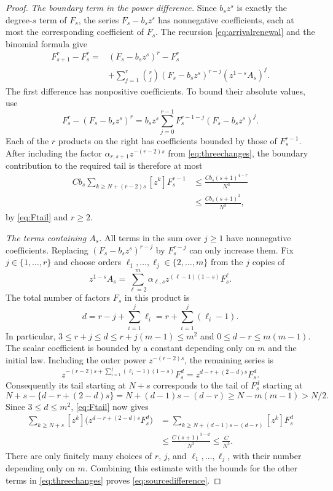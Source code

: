 \documentclass[11pt,letterpaper,reqno]{amsart}
\numberwithin{equation}{section}
\theoremstyle{plain}
\theoremstyle{remark}
\begin{document}
\begin{proof}
\emph{The boundary term in the power difference.}
Since $b_sz^s$ is exactly the degree-$s$ term of $F_s$, the series $F_s-b_sz^s$ has nonnegative coefficients, each at most the corresponding coefficient of $F_s$. The recursion \eqref{eq:arrivalrenewal} and the binomial formula give
\[
\begin{aligned}
 F_{s+1}^r-F_s^r
 ={}&(F_s-b_sz^s)^r-F_s^r\\
 &+\sum_{j=1}^r\binom rj(F_s-b_sz^s)^{r-j}
       (z^{1-s}A_s)^j.
\end{aligned}
\]
The first difference has nonpositive coefficients. To bound their absolute values, use
\[
 F_s^r-(F_s-b_sz^s)^r
 =b_sz^s\sum_{j=0}^{r-1}F_s^{r-1-j}(F_s-b_sz^s)^j.
\]
Each of the $r$ products on the right has coefficients bounded by those of $F_s^{r-1}$. After including the factor $\alpha_{r,s+1}z^{-(r-2)s}$ from \eqref{eq:threechanges}, the boundary contribution to the required tail is therefore at most
\[
\begin{aligned}
 Cb_s\sum_{k\ge N+(r-2)s}[z^k]F_s^{r-1}
 &\le\frac{Cb_s(s+1)^{4-r}}{N^3}\\
 &\le\frac{Cb_s(s+1)^2}{N^3},
\end{aligned}
\]
by \eqref{eq:Ftail} and $r\ge2$.

\emph{The terms containing $A_s$.}
All terms in the sum over $j\ge1$ have nonnegative coefficients. Replacing $(F_s-b_sz^s)^{r-j}$ by $F_s^{r-j}$ can only increase them. Fix $j\in\{1,\ldots,r\}$ and choose orders $\ell_1,\ldots,\ell_j\in\{2,\ldots,m\}$ from the $j$ copies of
\[
 z^{1-s}A_s=\sum_{\ell=2}^m\alpha_{\ell,s}
                  z^{(\ell-1)(1-s)}F_s^\ell.
\]
The total number of factors $F_s$ in this product is
\[
 d=r-j+\sum_{i=1}^j\ell_i
   =r+\sum_{i=1}^j(\ell_i-1).
\]
In particular, $3\le r+j\le d\le r+j(m-1)\le m^2$ and $0\le d-r\le m(m-1)$. The scalar coefficient is bounded by a constant depending only on $m$ and the initial law. Including the outer power $z^{-(r-2)s}$, the remaining series is
\begin{equation*}
 z^{-(r-2)s+\sum_{i=1}^j(\ell_i-1)(1-s)}F_s^d
 =z^{d-r+(2-d)s}F_s^d.
\end{equation*}
Consequently its tail starting at $N+s$ corresponds to the tail of $F_s^d$ starting at
\[
 N+s-\{d-r+(2-d)s\}
 =N+(d-1)s-(d-r)
 \ge N-m(m-1)>N/2.
\]
Since $3\le d\le m^2$, \eqref{eq:Ftail} now gives
\begin{equation*}
\begin{aligned}
 \sum_{k\ge N+s}[z^k]\bigl(z^{d-r+(2-d)s}F_s^d\bigr)
 &=\sum_{k\ge N+(d-1)s-(d-r)}[z^k]F_s^d\\
 &\le\frac{C(s+1)^{3-d}}{N^3}\le\frac C{N^3}.
\end{aligned}
\end{equation*}
There are only finitely many choices of $r$, $j$, and $\ell_1,\ldots,\ell_j$, with their number depending only on $m$. Combining this estimate with the bounds for the other terms in \eqref{eq:threechanges} proves \eqref{eq:sourcedifference}.
\end{proof}
\end{document}

